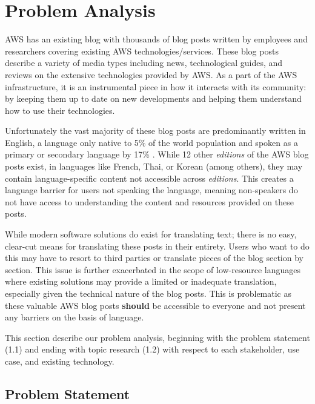 \section{Problem Analysis}
\label{sec:problemanalysis}
\indent \indent AWS has an existing blog with thousands of blog posts \cite{ChatGPT2023} written by employees and researchers covering existing AWS technologies/services. These blog posts describe a variety of media types including news, technological guides, and reviews on the extensive technologies provided by AWS. As a part of the AWS infrastructure, it is an instrumental piece in how it interacts with its community: by keeping them up to date on new developments and helping them understand how to use their technologies. 

\indent Unfortunately the vast majority of these blog posts are predominantly written in English, a language only native to 5\% of the world population and spoken as a primary or secondary language by 17\% \cite{ProjectOverview}. While 12 other \textit{editions} of the AWS blog posts exist, in languages like French, Thai, or Korean (among others), they may contain language-specific content not accessible across \textit{editions}. This creates a language barrier for users not speaking the language, meaning non-speakers do not have access to understanding the content and resources provided on these posts.

\indent While modern software solutions do exist for translating text; there is no easy, clear-cut means for translating these posts in their entirety. Users who want to do this may have to resort to third parties or translate pieces of the blog section by section. This issue is further exacerbated in the scope of low-resource languages where existing solutions may provide a limited or inadequate translation, especially given the technical nature of the blog posts. This is problematic as these valuable AWS blog posts \textbf{should} be accessible to everyone and not present any barriers on the basis of language. 

\indent This section describe our problem analysis, beginning with the problem statement (1.1) and ending with topic research (1.2) with respect to each stakeholder, use case, and existing technology.


\subsection{Problem Statement}

